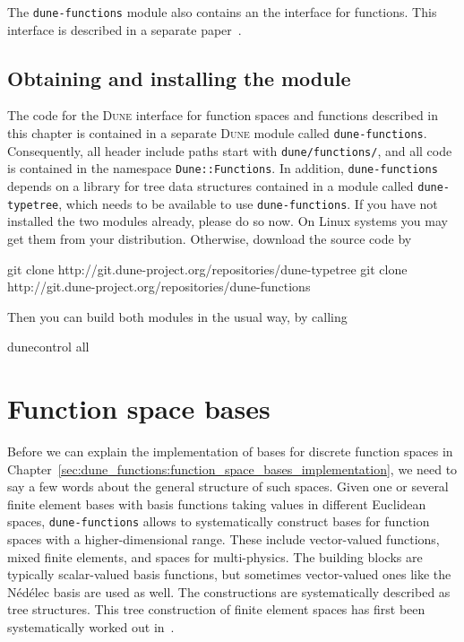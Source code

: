 \documentclass[a4paper,10pt,headings=normal,bibliography=totoc]{scrartcl}
\newcommand{\cpp}[1]{\lstinline[basicstyle=\ttfamily]!#1!}
\newcommand{\dune}{\textsc{Dune}\xspace}
\newcommand{\dunemodule}[1]{\texttt{#1}}
\newcommand{\todosander}[1]{\todo[inline,color=orange,author=OS]{#1}}
\begin{document}
The \dunemodule{dune-functions} module also contains an the interface for functions.
This interface is described in a separate paper~\cite{engwer_graeser_muething_sander:2015}.

\subsection{Obtaining and installing the module}

The code for the \dune interface for function spaces and functions
described in this chapter is contained in a separate \dune module called \dunemodule{dune-functions}.
Consequently, all header include paths
start with \cpp{dune/functions/}, and all code is contained in the namespace \cpp{Dune::Functions}.
In addition, \dunemodule{dune-functions} depends on a library for tree data structures contained in a module
called \dunemodule{dune-typetree}, which needs to be available to use \dunemodule{dune-functions}.
If you have not installed the two modules already, please do so now.  On Linux systems you may get them
from your distribution.  Otherwise, download the source code by
\begin{shellenv}
git clone http://git.dune-project.org/repositories/dune-typetree
git clone http://git.dune-project.org/repositories/dune-functions
\end{shellenv}
\todosander{The URLS need to be updated!}
Then you can build both modules in the usual way, by calling
\begin{shellenv}
dunecontrol all
\end{shellenv}



\section{Function space bases}
\label{sec:dune_functions:finite_element_trees}


Before we can explain the implementation of bases for discrete function spaces in Chapter~\ref{sec:dune_functions:function_space_bases_implementation},
we need to say a few words about the general structure of such spaces.  Given one or several finite element bases
with basis functions taking values in different Euclidean spaces,
\dunemodule{dune-functions} allows to systematically construct bases for function spaces with a
higher-dimensional range.  These include vector-valued functions, mixed finite elements, and spaces
for multi-physics.  The building blocks are typically scalar-valued basis functions, but sometimes vector-valued
ones like the N\'ed\'elec basis are used as well. The constructions are systematically described as tree structures.
This tree construction of finite element spaces has first been systematically worked out in~\cite{muething:2015}.
\end{document}
